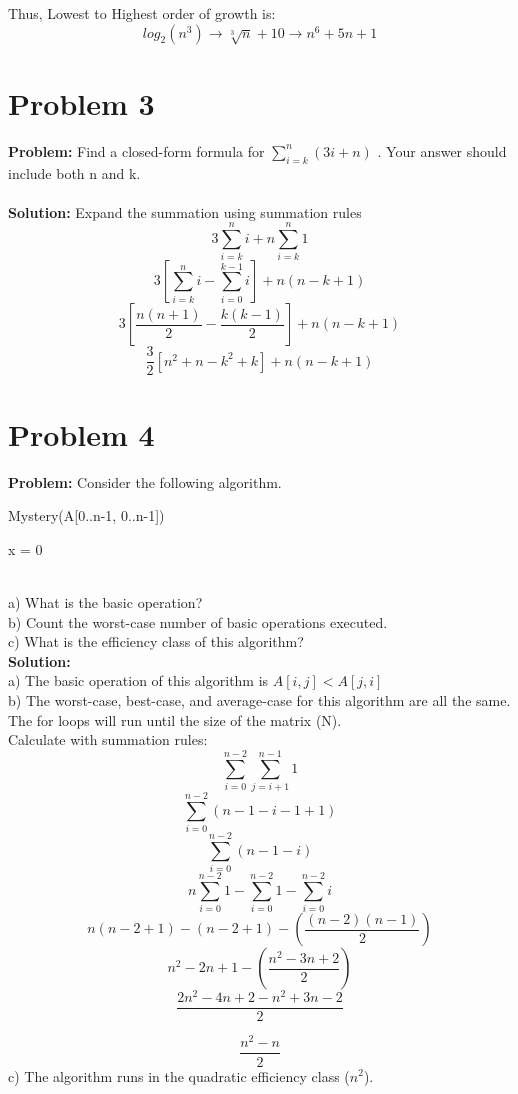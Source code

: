 \documentclass{article}
\begin{document}
Thus, Lowest to Highest order of growth is: \[log_2(n^3) \to \sqrt[3]{n} + 10 \to n^6 +5n +1\]

\section{Problem 3}
\textbf{Problem: }
Find a closed-form formula for $\sum_{i=k}^{n} (3i+n)$ . Your answer should include both n and k. \\
\\
\textbf{Solution: }
Expand the summation using summation rules
\[3 \sum_{i=k}^{n} i + n \sum_{i=k}^{n} 1 \]
\[3[\sum_{i=k}^{n}i - \sum_{i=0}^{k-1}i ] + n(n-k+1) \]
\[3[\frac{n(n+1)}{2} - \frac{k(k-1)}{2}] + n(n-k+1)\]
\[
\boxed
{\frac{3}{2}[n^2 + n - k^2 + k] + n(n-k+1)}
\]

\section{Problem 4}
\textbf{Problem: }
Consider the following algorithm.\\
\begin{algorithm}
\caption{Mystery(A[0..n-1, 0..n-1])}
x = 0 \\
\end{algorithm} \\
a) What is the basic operation? \\
b) Count the worst-case number of basic operations executed.\\
c) What is the efficiency class of this algorithm?\\
\textbf{Solution: }\\
a) The basic operation of this algorithm is $A[i,j] < A[j,i]$\\
b) The worst-case, best-case, and average-case for this algorithm are all the same. The for loops will run until the size of the matrix (N). \\
    Calculate with summation rules:
    \[\sum_{i=0}^{n-2} \sum_{j=i+1}^{n-1} 1\]
    \[\sum_{i=0}^{n-2} (n-1-i-1+1)\]
    \[\sum_{i=0}^{n-2} (n-1-i)\]
    \[n\sum_{i=0}^{n-2} 1 - \sum_{i=0}^{n-2} 1 - \sum_{i=0}^{n-2} i\]
    \[n(n-2+1) - (n-2+1) - (\frac{(n-2)(n-1)}{2})\]
    \[n^2 - 2n + 1 - (\frac{n^2 - 3n + 2}{2})\]
    \[\frac{2n^2 - 4n + 2 - n^2 + 3n - 2}{2}\]
    
    \[
    \boxed
    {\frac{n^2 - n}{2}}
    \]
c) The algorithm runs in the quadratic efficiency class ($n^2$).\\
\end{document}
